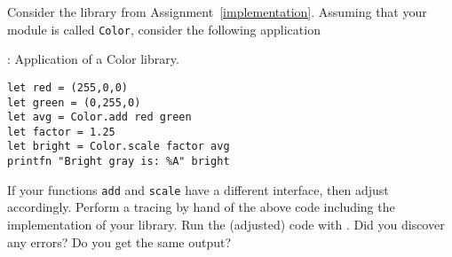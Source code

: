 Consider the library from Assignment~\ref{implementation}. Assuming
that your module is called \lstinline{Color}, consider the following application
\begin{codeNOutput}{: Application of a Color library.}
  \begin{lstlisting}
let red = (255,0,0)
let green = (0,255,0)  
let avg = Color.add red green
let factor = 1.25
let bright = Color.scale factor avg
printfn "Bright gray is: %A" bright
  \end{lstlisting}
\end{codeNOutput}
If your functions \lstinline{add} and \lstinline{scale} have a
different interface, then adjust accordingly. Perform a tracing by
hand of the above code including the implementation of your
library. Run the (adjusted) code with . Did you
discover any errors? Do you get the same output?
